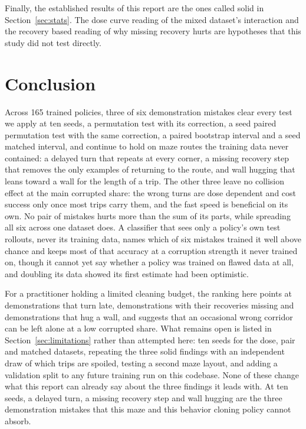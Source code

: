 \documentclass[conference]{IEEEtran}
\begin{document}
Finally, the established results of this report are the ones called solid in Section~\ref{sec:stats}. The dose
curve reading of the mixed dataset's interaction and the recovery based reading of why missing recovery hurts are
hypotheses that this study did not test directly.

\section{Conclusion}

Across 165 trained policies, three of six demonstration mistakes clear every test we apply at ten seeds, a
permutation test with its correction, a seed paired permutation test with the same correction, a paired
bootstrap interval and a seed matched interval, and continue to hold on maze routes the training data never
contained: a delayed turn that repeats at every corner, a missing recovery step that removes the only examples
of returning to the route, and wall hugging that leans toward a wall for the length of a trip. The other three
leave no collision effect at the main corrupted share: the wrong turns are dose dependent and cost success only
once most trips carry them, and the fast speed is beneficial on its own. No pair of mistakes hurts more than the
sum of its parts, while spreading all six across one dataset does. A classifier that sees only a policy's own
test rollouts, never its training data, names which of six mistakes trained it well above chance and keeps most
of that accuracy at a corruption strength it never trained on, though it cannot yet say whether a policy was
trained on flawed data at all, and doubling its data showed its first estimate had been optimistic.

For a practitioner holding a limited cleaning budget, the ranking here points at demonstrations that turn late,
demonstrations with their recoveries missing and demonstrations that hug a wall, and suggests that an occasional
wrong corridor can be left alone at a low corrupted share. What remains open is listed in
Section~\ref{sec:limitations} rather than attempted here: ten seeds for the dose, pair and matched datasets,
repeating the three solid findings with an independent draw of which trips are spoiled, testing a second maze
layout, and adding a validation split to any future training run on this codebase. None of these change what
this report can already say about the three findings it leads with. At ten seeds, a delayed turn, a missing
recovery step and wall hugging are the three demonstration mistakes that this maze and this behavior cloning
policy cannot absorb.
\end{document}
